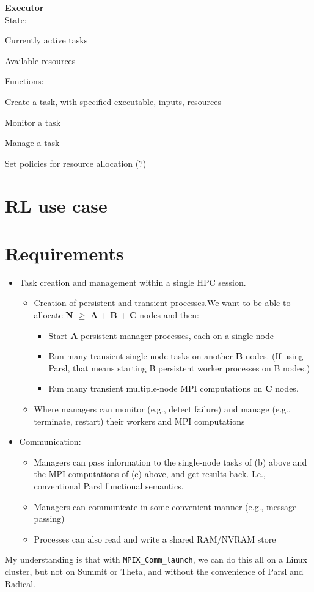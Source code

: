 \documentclass[10pt]{article}
\begin{document}
\vspace{1ex}

\noindent
\textbf{Executor}\\
State:
\begin{compactitem}
\item
Currently active tasks
\item
Available resources
\end{compactitem}
Functions:
\begin{compactitem}
\item
Create a task, with specified executable, inputs, resources
\item
Monitor a task
\item
Manage a task
\item
Set policies for resource allocation (?)
\end{compactitem}



\section{RL use case}





\section{Requirements}

\begin{itemize}
\item
Task creation and management within a single HPC session.
\begin{itemize}
\item Creation of persistent and transient processes.We want to be able to allocate \textbf{N} $\ge$  \textbf{A} +  \textbf{B} +  \textbf{C} nodes and then:
\begin{itemize}
\item
Start  \textbf{A} persistent manager processes, each on a single node
\item
Run many transient single-node tasks on another \textbf{B} nodes. (If using Parsl, that means starting B persistent worker processes on B nodes.)
\item
Run many transient multiple-node MPI computations on  \textbf{C} nodes.
\end{itemize}
\item
Where managers can monitor (e.g., detect failure) and manage (e.g., terminate, restart) their workers and MPI computations
\end{itemize}
\item
Communication:
\begin{itemize}
\item
Managers can pass information to the single-node tasks of (b) above and the MPI computations of (c) above, and get results back. I.e., conventional Parsl functional semantics.
\item
Managers can communicate in some convenient manner (e.g., message passing)
\item
Processes can also read and write a shared RAM/NVRAM store
\end{itemize}
\end{itemize}

My understanding is that with \texttt{MPIX\_Comm\_launch}, we can do this all on a Linux cluster, but not on Summit or Theta, and without the convenience of Parsl and Radical.
\end{document}
